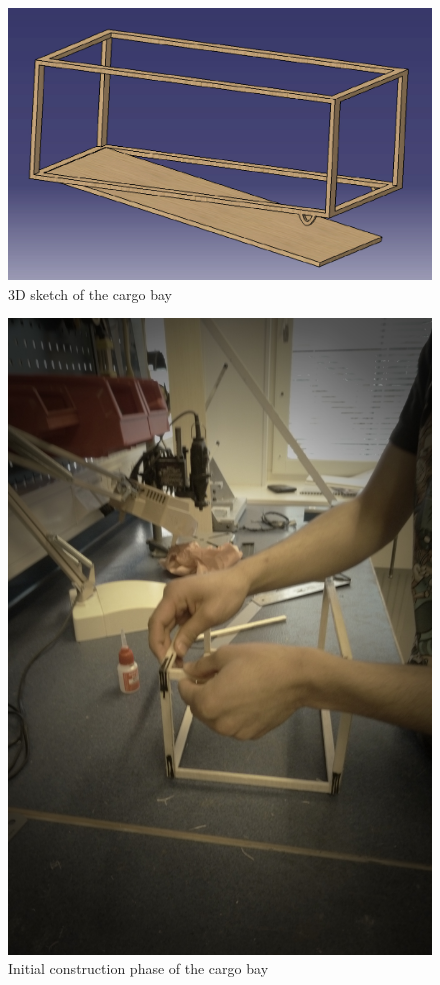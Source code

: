 \begin{figure}[bht]
\centering
\includegraphics[scale=0.5]{figures/box.png}
\caption{3D sketch of the cargo bay} 
\label{fig:box}
\end{figure}

\begin{figure}[bht]
\centering
\includegraphics[width=\textwidth]{figures/boxinit.jpg}
\caption{Initial construction phase of the cargo bay}
\label{fig:boxinit}
\end{figure}

